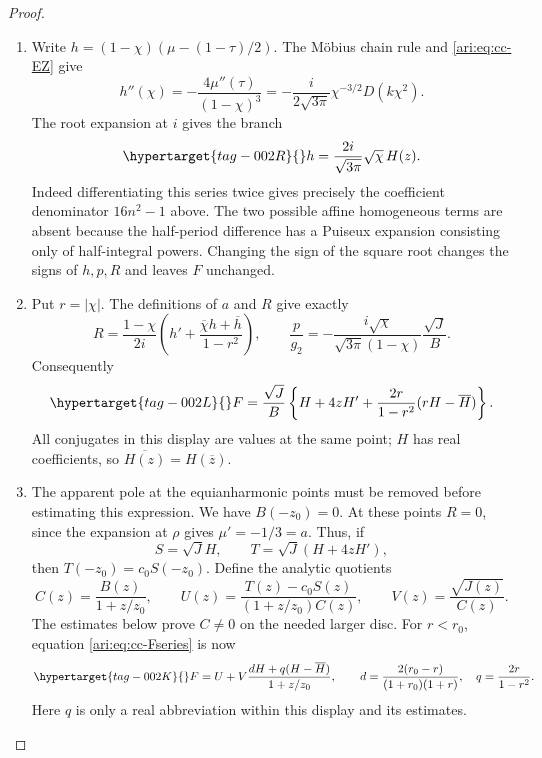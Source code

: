 \begin{proof}
\begin{enumerate}[label=\arabic*.,leftmargin=*]
\item Write $h=(1-\chi)(\mu-(1-\tau)/2)$. The Möbius chain rule and
\eqref{ari:eq:cc-EZ} give
\[
 h''(\chi)=-\frac{4\mu''(\tau)}{(1-\chi)^3}
       =-\frac{i}{2\sqrt{3\pi}}\chi^{-3/2}D(k\chi^2).
\]
The root expansion at $i$ gives the branch
\begin{equation}\hypertarget{tag-002R}{}\label{ari:eq:cc-h}
 h=\frac{2i}{\sqrt{3\pi}}\sqrt \chi\,H(z).
\end{equation}
Indeed differentiating this series twice gives precisely the
coefficient denominator $16n^2-1$ above. The two possible affine
homogeneous terms are absent because the half-period difference
has a Puiseux expansion consisting only of half-integral powers.
Changing the sign of the square root changes the signs of $h,p,R$
and leaves $F$ unchanged.

\item Put $r=|\chi|$. The definitions of $a$ and $R$ give exactly
\[
 R=\frac{1-\chi}{2i}
       \left(h'+\frac{\overline \chi h+\overline h}{1-r^2}\right),
 \qquad
 \frac p{g_2}=-\frac{i\sqrt \chi}{\sqrt{3\pi}(1-\chi)}
                         \frac{\sqrt J}{B}.
\]
Consequently
\begin{equation}\hypertarget{tag-002L}{}\label{ari:eq:cc-Fseries}
 F=\frac{\sqrt J}{B}
 \left\{H+4zH'+\frac{2r}{1-r^2}(rH-\overline H)\right\}.
\end{equation}
All conjugates in this display are values at the same point;
$H$ has real coefficients, so $\overline{H(z)}=H(\overline z)$.

\item The apparent pole at the equianharmonic points must be removed
before estimating this expression. We have $B(-z_0)=0$.
At these points $R=0$, since the expansion at $\rho$ gives
$\mu'=-1/3=a$. Thus, if
\[
 S=\sqrt J H,\qquad T=\sqrt J(H+4zH'),
\]
then $T(-z_0)=c_0S(-z_0)$. Define the analytic quotients
\[
 C(z)=\frac{B(z)}{1+z/z_0},\qquad
 U(z)=\frac{T(z)-c_0S(z)}{(1+z/z_0)C(z)},\qquad
 V(z)=\frac{\sqrt{J(z)}}{C(z)}.
\]
The estimates below prove $C\ne0$ on the needed larger disc.
For $r<r_0$, equation \eqref{ari:eq:cc-Fseries} is now
\begin{equation}\hypertarget{tag-002K}{}\label{ari:eq:cc-Ffactored}
 F=U+V\frac{dH+q(H-\overline H)}{1+z/z_0},
 \qquad
 d=\frac{2(r_0-r)}{(1+r_0)(1+r)},\quad q=\frac{2r}{1-r^2}.
\end{equation}
Here $q$ is only a real abbreviation within this display and
its estimates.


\end{enumerate}
\end{proof}

